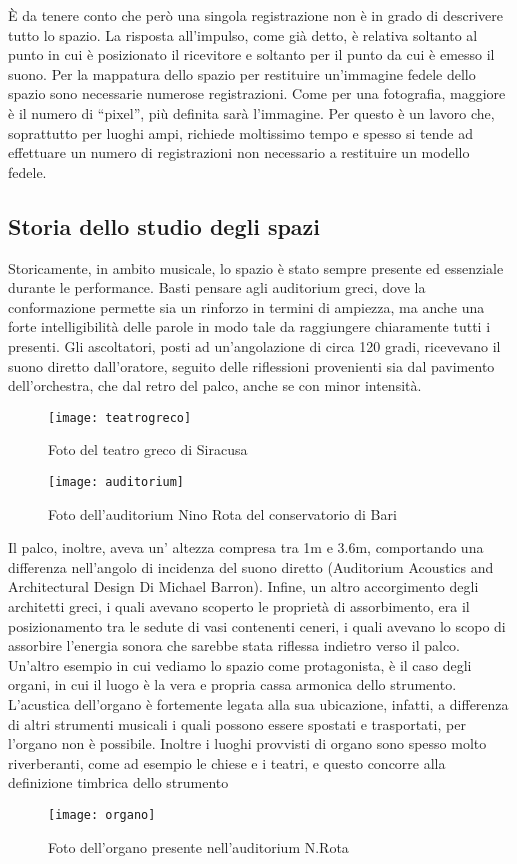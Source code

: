 È da tenere conto che però una singola registrazione non è in grado di descrivere tutto lo spazio. La risposta all’impulso, come già detto, è relativa soltanto al punto in cui è posizionato il ricevitore e soltanto per il punto da cui è emesso il suono. Per la mappatura dello spazio per restituire un'immagine fedele dello spazio sono necessarie numerose registrazioni. Come per una fotografia, maggiore è il numero di “pixel”, più definita sarà l’immagine. Per questo è un lavoro che, soprattutto per luoghi ampi, richiede moltissimo tempo e spesso si tende ad effettuare un numero di registrazioni non necessario a restituire un modello fedele.

\subsection{Storia dello studio degli spazi}

Storicamente, in ambito musicale, lo spazio è stato sempre presente ed essenziale durante le performance. Basti pensare agli auditorium greci, dove la conformazione permette sia un rinforzo in termini di ampiezza, ma anche una forte intelligibilità delle parole in modo tale da raggiungere chiaramente tutti i presenti.
Gli ascoltatori, posti ad un'angolazione di circa 120 gradi, ricevevano il suono diretto dall’oratore, seguito delle riflessioni provenienti sia dal pavimento dell’orchestra, che dal retro del palco, anche se con minor intensità.
\begin{figure}[h]
\centering
\texttt{[image: teatrogreco]}
\caption{Foto del teatro greco di Siracusa}
\label{fig:teatrogreco}
\texttt{[image: auditorium]}
\caption{Foto dell'auditorium Nino Rota del conservatorio di Bari}
\label{fig:auditorium}
\end{figure}
Il palco, inoltre, aveva un’ altezza compresa tra 1m e 3.6m, comportando una differenza nell’angolo di incidenza del suono diretto (Auditorium Acoustics and Architectural Design Di Michael Barron).
Infine, un altro accorgimento degli architetti greci, i quali avevano scoperto le proprietà di assorbimento, era il posizionamento tra le sedute di vasi contenenti ceneri, i quali avevano lo scopo di assorbire l’energia sonora che sarebbe stata riflessa indietro verso il palco.
\bigskip
Un’altro esempio in cui vediamo lo spazio come protagonista, è il caso degli organi, in cui il luogo è la vera e propria cassa armonica dello strumento.
L’acustica dell’organo è fortemente legata alla sua ubicazione, infatti, a differenza di altri strumenti musicali i quali possono essere spostati e trasportati, per l’organo non è possibile. Inoltre i luoghi provvisti di organo sono spesso molto riverberanti, come ad esempio le chiese e i teatri, e questo concorre alla definizione timbrica dello strumento
\begin{figure}[h]
\centering
\texttt{[image: organo]}
\caption{Foto dell'organo presente nell'auditorium N.Rota}
\label{fig:organo}
\end{figure}
